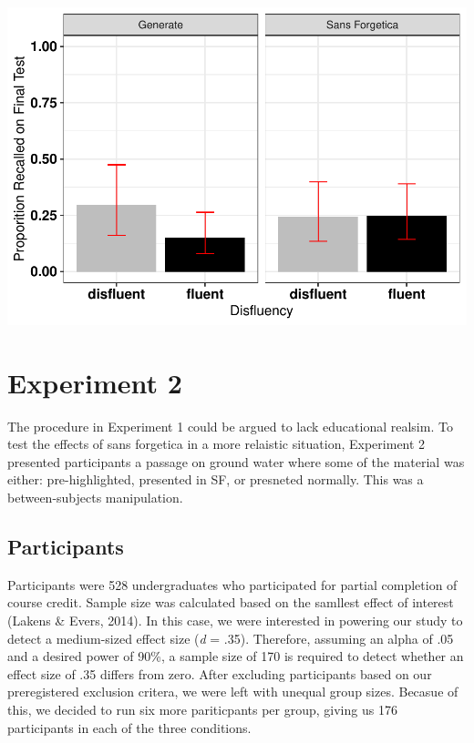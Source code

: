 \documentclass[doc]{apa6}
\begin{document}
\includegraphics{SF_Paper_files/figure-latex/unnamed-chunk-1-1.pdf}

\hypertarget{experiment-2}{%
\section{Experiment 2}\label{experiment-2}}

The procedure in Experiment 1 could be argued to lack educational realsim. To test the effects of sans forgetica in a more relaistic situation, Experiment 2 presented participants a passage on ground water where some of the material was either: pre-highlighted, presented in SF, or presneted normally. This was a between-subjects manipulation.

\hypertarget{participants-1}{%
\subsection{Participants}\label{participants-1}}

Participants were 528 undergraduates who participated for partial completion of course credit. Sample size was calculated based on the samllest effect of interest (Lakens \& Evers, 2014). In this case, we were interested in powering our study to detect a medium-sized effect size (\emph{d} = .35). Therefore, assuming an alpha of .05 and a desired power of 90\%, a sample size of 170 is required to detect whether an effect size of .35 differs from zero. After excluding participants based on our preregistered exclusion critera, we were left with unequal group sizes. Becasue of this, we decided to run six more pariticpants per group, giving us 176 participants in each of the three conditions.
\end{document}
